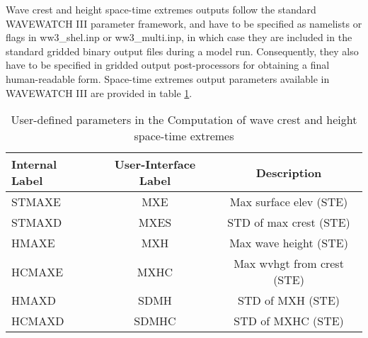 Wave crest and height space-time extremes outputs follow the standard WAVEWATCH III parameter framework, and have to be specified as namelists or flags in ww3\_shel.inp or ww3\_multi.inp, in which case they are included in the standard gridded binary output files during a model run. Consequently, they also have to be specified in gridded output post-processors for obtaining a final human-readable form. Space-time extremes output parameters available in WAVEWATCH III are provided in table \ref{tab:ste_parm}.

\begin{table}[h]
\begin{center} \begin{tabular}{|l|c|c|} \hline \hline
Internal Label & User-Interface Label & Description \\ \hline
STMAXE  &   MXE   & Max surface elev (STE) \\
STMAXD  &   MXES  & STD of max crest (STE) \\
HMAXE   &   MXH   & Max wave height (STE) \\
HCMAXE  &   MXHC  & Max wvhgt from crest (STE) \\
HMAXD   &   SDMH  & STD of MXH (STE) \\
HCMAXD  &   SDMHC & STD of MXHC (STE) \\ \hline
\end{tabular}
\end{center}
\caption{User-defined parameters in the Computation of wave crest and height space-time extremes}
\label{tab:ste_parm} \botline \end{table}


